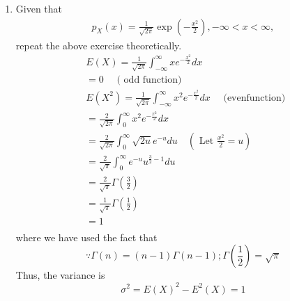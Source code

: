 \documentclass[10pt, a4paper]{article}
\providecommand{\brak}[1]{\ensuremath{\left(#1\right)}}
\begin{document}
\begin{enumerate}
\item Given that 
\begin{align}
p_{X}(x) = \frac{1}{\sqrt{2\pi}}\exp\brak{-\frac{x^2}{2}}, -\infty < x < \infty,
\end{align}
repeat the above exercise theoretically.
$$
\begin{aligned}
& E(X)=\frac{1}{\sqrt{2 \pi}} \int_{-\infty}^{\infty} x e^{-\frac{x^2}{2}} d x \\
& =0 \quad \text { ( odd function) } \\
& E\left(X^2\right)=\frac{1}{\sqrt{2 \pi}} \int_{-\infty}^{\infty} x^2 e^{-\frac{x^2}{2}} d x \quad \text { (evenfunction) } \\
& =\frac{2}{\sqrt{2 \pi}} \int_0^{\infty} x^2 e^{-\frac{x^2}{2}} d x \\
& =\frac{2}{\sqrt{2 \pi}} \int_0^{\infty} \sqrt{2 u} e^{-u} d u \quad\left(\text { Let } \frac{x^2}{2}=u\right) \\
& =\frac{2}{\sqrt{\pi}} \int_0^{\infty} e^{-u} u^{\frac{3}{2}-1} d u \\
& =\frac{2}{\sqrt{\pi}} \Gamma\left(\frac{3}{2}\right) \\
& =\frac{1}{\sqrt{\pi}} \Gamma\left(\frac{1}{2}\right) \\
& =1 \\
&
\end{aligned}
$$
where we have used the fact that
$$
\because \Gamma(n)=(n-1) \Gamma(n-1) ; \Gamma\left(\frac{1}{2}\right)=\sqrt{\pi}
$$
Thus, the variance is
$$
\sigma^2=E(X)^2-E^2(X)=1
$$
\end{enumerate}
\end{document}
